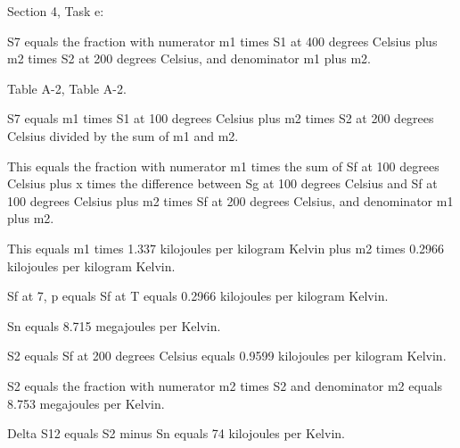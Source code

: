 Section 4, Task e:

S7 equals the fraction with numerator m1 times S1 at 400 degrees Celsius plus m2 times S2 at 200 degrees Celsius, and denominator m1 plus m2.

Table A-2, Table A-2.

S7 equals m1 times S1 at 100 degrees Celsius plus m2 times S2 at 200 degrees Celsius divided by the sum of m1 and m2.

This equals the fraction with numerator m1 times the sum of Sf at 100 degrees Celsius plus x times the difference between Sg at 100 degrees Celsius and Sf at 100 degrees Celsius plus m2 times Sf at 200 degrees Celsius, and denominator m1 plus m2.

This equals m1 times 1.337 kilojoules per kilogram Kelvin plus m2 times 0.2966 kilojoules per kilogram Kelvin.

Sf at 7, p equals Sf at T equals 0.2966 kilojoules per kilogram Kelvin.

Sn equals 8.715 megajoules per Kelvin.

S2 equals Sf at 200 degrees Celsius equals 0.9599 kilojoules per kilogram Kelvin.

S2 equals the fraction with numerator m2 times S2 and denominator m2 equals 8.753 megajoules per Kelvin.

Delta S12 equals S2 minus Sn equals 74 kilojoules per Kelvin.